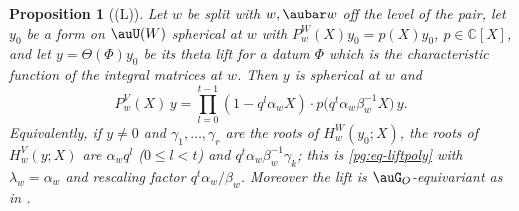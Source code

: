 \documentclass[10pt]{amsart}
\newtheorem{proposition}[theorem]{Proposition}
\theoremstyle{definition}
\theoremstyle{remark}
\newcommand{\C}{\mathbb C}
\begin{document}
\begin{proposition}[(L)]\label{pga:L}
Let $w$ be split with $w,\aubar w$ off the level of the pair, let $y_0$ be a form on $\auU(W)$
spherical at $w$ with $P^W_w(X)y_0=p(X)y_0$, $p\in\C[X]$, and let $y=\Theta(\Phi)y_0$ be its theta
lift for a datum $\Phi$ which is the characteristic function of the integral matrices at $w$. Then
$y$ is spherical at $w$ and
\begin{equation}\label{pga:eq-L}
P_w^V(X)\,y=\prod_{l=0}^{t-1}(1-q^l\alpha_wX)\cdot p\bigl(q^t\alpha_w\beta_w^{-1}X\bigr)\,y .
\end{equation}
Equivalently, if $y\ne0$ and $\gamma_1,\dots,\gamma_r$ are the roots of $H^W_w(y_0;X)$, the roots
of $H^V_w(y;X)$ are $\alpha_wq^l$ ($0\le l<t$) and $q^t\alpha_w\beta_w^{-1}\gamma_k$; this is
\eqref{pg:eq-liftpoly} with $\lambda_w=\alpha_w$ and rescaling factor $q^t\alpha_w/\beta_w$.
Moreover the lift is $\auG_O$-equivariant as in {\cite[Proposition~14.27]{P46}}.
\end{proposition}
\end{document}
